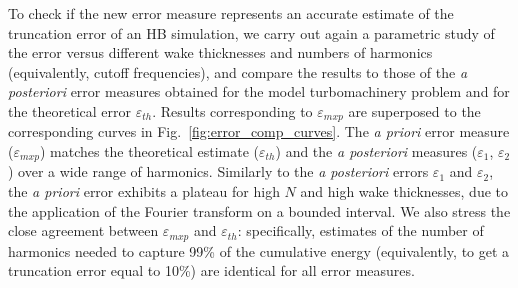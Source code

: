 To check if the new error measure represents an 
accurate estimate of the truncation error of 
an HB simulation, we carry out again a 
parametric study of the error versus different 
wake thicknesses and numbers of harmonics 
(equivalently, cutoff frequencies), and compare 
the results to those of the \emph{a posteriori} error measures 
obtained for the model turbomachinery problem and for the 
theoretical error $\varepsilon_{th}$. 
Results corresponding to $\varepsilon_{mxp}$ are 
superposed to the corresponding curves in Fig.~\ref{fig:error_comp_curves}. 
The \emph{a priori} error measure ($\varepsilon_{mxp}$) matches 
the theoretical estimate ($\varepsilon_{th}$)
and the \emph{a posteriori} measures ($\varepsilon_1$, $\varepsilon_2$)
over a wide range of harmonics. Similarly to the \emph{a posteriori}
errors $\varepsilon_1$ and $\varepsilon_2$, the \emph{a priori} error
exhibits a plateau for high $N$ and high wake thicknesses, 
due to the application of the Fourier transform on a bounded interval. 
We also stress the close agreement between 
$\varepsilon_{mxp}$ and $\varepsilon_{th}$: specifically, 
estimates of the number of harmonics needed to capture 99\% 
of the cumulative energy (equivalently, to get a 
truncation error equal to 10\%) are identical for 
all error measures.